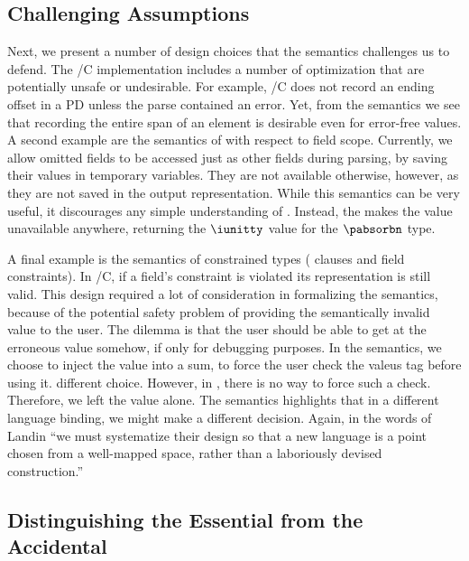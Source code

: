 \subsection{Challenging Assumptions}

Next, we present a number of design choices that the semantics
challenges us to defend. The \pads{}/C implementation includes a
number of optimization that are potentially unsafe or undesirable.
For example, \pads{}/C does not record an ending offset in a PD unless
the parse contained an error. Yet, from the semantics we see that
recording the entire span of an element is desirable even for
error-free values.  A second example are the semantics of \Pomit{}
with respect to field scope. Currently, we allow omitted fields to be
accessed just as other fields during parsing, by saving their values
in temporary variables.  They are not available otherwise, however, as
they are not saved in the output representation. While this semantics
can be very useful, it discourages any simple understanding of
\Pomit{}. Instead, the \ddc{} makes the value unavailable anywhere,
returning the $\iunitty$ value for the $\pabsorbn$ type.

A final example is the semantics of constrained types (\Pwhere{}
clauses and field constraints).  In \pads{}/C, if a field's constraint
is violated its representation is still valid. This design required a lot of
consideration in formalizing the semantics, because of the potential
safety problem of providing the semantically invalid value to the
user.  The dilemma is that the user should be able to get at the
erroneous value somehow, if only for debugging purposes. In the
semantics, we choose to inject the value into a sum, to force the user
check the valeus tag before using it.  different choice. However, in
\C{}, there is no way to force such a check. Therefore, we left the
value alone. The semantics highlights that in a different language
binding, we might make a different decision.  Again, in the words of
Landin ``we must systematize their design so that a new language is a
point chosen from a well-mapped space, rather than a laboriously
devised construction.''

\subsection{Distinguishing the Essential from the Accidental}

